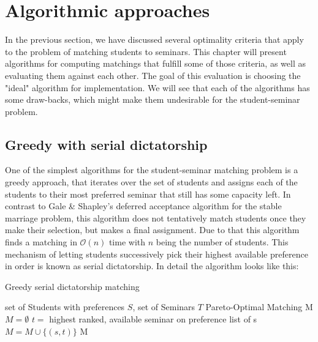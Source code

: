 \section{Algorithmic approaches}\label{chapter:algorithms}
In the previous section, we have discussed several optimality criteria that apply to the problem of matching students to seminars. This chapter will present algorithms for computing matchings that fulfill some of those criteria, as well as evaluating them against each other. The goal of this evaluation is choosing the "ideal" algorithm for implementation. We will see that each of the algorithms has some draw-backs, which might make them undesirable for the student-seminar problem. 

\subsection{Greedy with serial dictatorship}
One of the simplest algorithms for the student-seminar matching problem is a greedy approach, that iterates over the set of students and assigns each of the students to their most preferred seminar that still has some capacity left. In contrast to Gale \& Shapley's deferred acceptance algorithm for the stable marriage problem, this algorithm does not tentatively match students once they make their selection, but makes a final assignment. Due to that this algorithm finds a matching in $\mathcal{O}(n)$ time with $n$ being the number of students. This mechanism of letting students successively pick their highest available preference in order is known as serial dictatorship.\cite{MANEA2007316} In detail the algorithm looks like this: 

\begin{algorithm} %
    \caption{Greedy serial dictatorship matching} 
    \label{alg1} %
    \begin{algorithmic} %
        \Require set of Students with preferences $S$, set of Seminars $T$
        \Ensure Pareto-Optimal Matching M
        \State $M = \emptyset$
            \State $t =$ highest ranked, available seminar on preference list of s
                \State $M = M \cup \{(s, t)\}$
            \EndIf
        \EndFor
        \State\Return M
        \EndFunction
    \end{algorithmic}
\end{algorithm}

